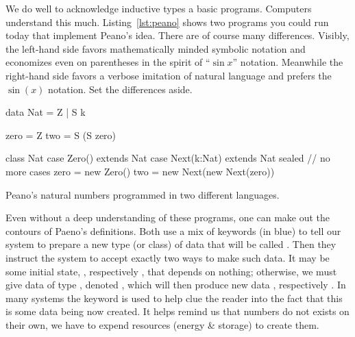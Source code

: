 We do well to acknowledge inductive types a basic programs.
Computers understand this much.
Listing~\ref{lst:peano} shows two programs you could run today that implement Peano's idea.
There are of course many differences.  Visibly, the left-hand side 
favors mathematically minded symbolic notation and 
economizes even on parentheses in the spirit of ``$\sin x$'' notation.
Meanwhile the right-hand side favors a verbose imitation of 
natural language and prefers the $\sin(x)$ notation.  Set the differences 
aside.

\begin{lstfloat}
\begin{center}
\begin{minipage}{0.34\textwidth}
\begin{Fcode}[]
data Nat = Z 
         | S k

zero = Z
two = S (S zero)
\end{Fcode}
\end{minipage}
\hfill
\begin{minipage}{0.65\textwidth}
\begin{Pcode}[language=Sava]
class Nat
    case Zero() extends Nat
    case Next(k:Nat) extends Nat
sealed  // no more cases
zero = new Zero()
two = new Next(new Next(zero))
\end{Pcode}
\end{minipage}
\end{center}
\caption{Peano's natural numbers programmed in two different languages.}
\label{lst:peano}
\end{lstfloat}
    

Even without a deep understanding of these programs, one can make out the
contours of Paeno's definitions.  Both use a mix of keywords (in blue) to tell
our system to prepare a new type (or class) of data that will be called
.  Then they instruct the system to accept exactly two ways to make
such data. It may be some initial state, , respectively ,
that depends on nothing; otherwise, we must give data  of type
, denoted , which will then produce new data ,
respectively .  In many systems the keyword  is 
used to help clue the reader into the fact that this is some data being now 
created.  It helps remind us that numbers do not  exists on their own, 
we have to expend resources (energy \& storage) to create them. 

